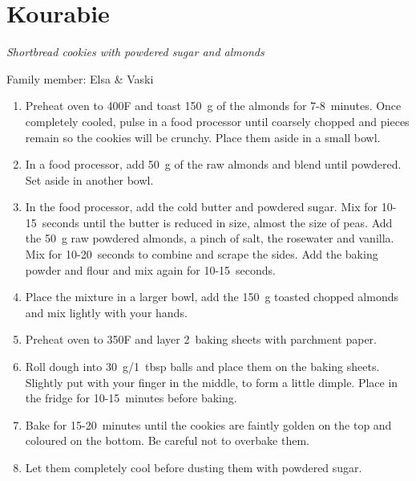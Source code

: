 \chapter{Kourabie}
\label{ch:kourabie}



\textit{Shortbread cookies with powdered sugar and almonds}

Family member: Elsa \& Vaski

\begin{enumerate}
    \item Preheat oven to 400\degree F and toast 150~g of the almonds for 7-8~minutes. Once completely cooled, pulse in a food processor until coarsely chopped and pieces remain so the cookies will be crunchy. Place them aside in a small bowl.
    \item In a food processor, add 50~g of the raw almonds and blend until powdered. Set aside in another bowl.
    \item In the food processor, add the cold butter and powdered sugar. Mix for 10-15~seconds until the butter is reduced in size, almost the size of peas. Add the 50~g raw powdered almonds, a pinch of salt, the rosewater and vanilla. Mix for 10-20~seconds to combine and scrape the sides. Add the baking powder and flour and mix again for 10-15~seconds.
    \item Place the mixture in a larger bowl, add the 150~g toasted  chopped almonds and mix lightly with your hands.
    \item Preheat oven to 350\degree F and layer 2~baking sheets with parchment paper.
    \item Roll dough into 30~g/1~tbsp balls and place them on the baking sheets. Slightly put with your finger in the middle, to form a little dimple. Place in the fridge for 10-15~minutes before baking.
    \item Bake for 15-20~minutes until the cookies are faintly golden on the top and coloured on the bottom. Be careful not to overbake them.
    \item Let them completely cool before dusting them with powdered sugar.
\end{enumerate}
